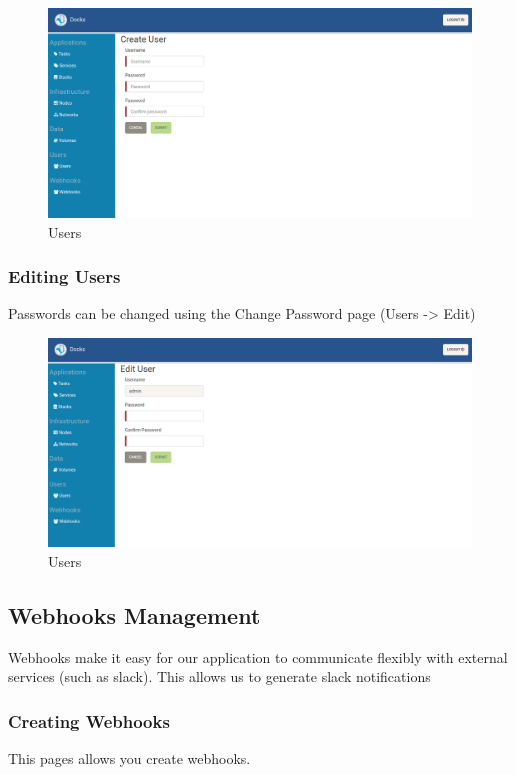 \documentclass[]{article}
\begin{document}
\begin{figure}[H]
	\centering
	\includegraphics[scale=0.4]{users_create.png}
	\caption{Users}
\end{figure}

\subsubsection{Editing Users}
Passwords can be changed using the Change Password page (Users -> Edit)

\begin{figure}[H]
	\centering
	\includegraphics[scale=0.4]{users_edit.png}
	\caption{Users}
\end{figure}

\subsection{Webhooks Management}
Webhooks make it easy for our application to communicate 
flexibly with external services (such as slack). This allows us to 
generate slack notifications

\subsubsection{Creating Webhooks}
This pages allows you create webhooks.
\end{document}
